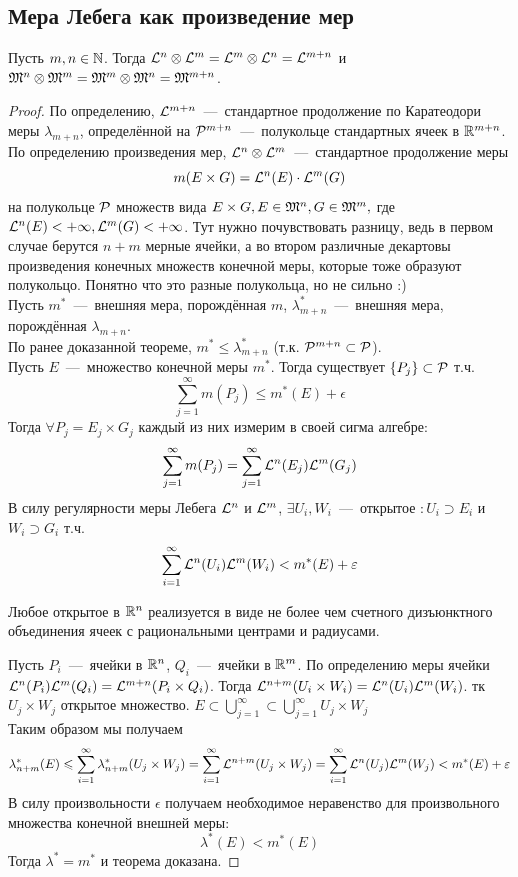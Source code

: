 \subsection{Мера Лебега как произведение мер}
\begin{theorem}
    Пусть $m, n \in \mathbb{N}$. Тогда $\mathcal{L}^n \otimes \mathcal{L}^m = \mathcal{L}^m \otimes \mathcal{L}^n = \mathcal{L}^{m + n}$ и $\mathfrak{M}^n \otimes \mathfrak{M}^m = \mathfrak{M}^m \otimes \mathfrak{M}^n = \mathfrak{M}^{m + n}$.
\end{theorem}
\begin{proof}
    По определению, $\mathcal{L}^{m + n}$~---~стандартное продолжение по Каратеодори меры $\lambda_{m + n}$, определённой на $\mathcal{P}^{m + n}$~---~полукольце стандартных ячеек в $\mathbb{R}^{m + n}$. \\
    По определению произведения мер, $\mathcal{L}^n \otimes \mathcal{L}^m$~---~стандартное продолжение меры $$m(E \times G) = \mathcal{L}^n(E)\cdot\mathcal{L}^m(G)$$ на полукольце $\mathcal{P}$ множеств вида $E \times G, E \in \mathfrak{M}^n, G \in \mathfrak{M}^m,$ где $ \mathcal{L}^n(E) < +\infty, \mathcal{L}^m(G) < +\infty$. Тут нужно почувствовать разницу, ведь в первом случае берутся  $n+m$ мерные ячейки, а во втором различные декартовы произведения конечных множеств конечной меры, которые тоже образуют полукольцо. Понятно что это разные полукольца, но не сильно :) \\
    Пусть $m^*$~---~внешняя мера, порождённая $m$, $\lambda_{m + n}^*$~---~внешняя мера, порождённая $\lambda_{m + n}$. \\
    По ранее доказанной теореме, $m^* \leq \lambda_{m + n}^*$ (т.к. $\mathcal{P}^{m + n} \subset \mathcal{P}$). \\
    Пусть $E$~---~множество конечной меры $m^*$. Тогда существует $\{P_j\} \subset \mathcal{P}$ т.ч. \[\sum\limits_{j = 1}^\infty m(P_j) \leq m^*(E) + \epsilon\]
    Тогда $\forall P_j = E_j \times G_j$ каждый из них измерим в своей сигма алгебре:
    \[
    \sum\limits_{j = 1}^\infty m(P_j) =  \sum\limits_{j = 1}^\infty \mathcal{L}^n(E_j) \mathcal{L}^m(G_j)
    \]
    В силу регулярности меры Лебега $\mathcal{L}^n$ и $\mathcal{L}^m$, $\exists U_i, W_i$~---~открытое $:U_i\supset E_i$ и $W_i \supset G_i$ т.ч. \[\sum\limits_{i = 1}^\infty \mathcal{L}^n(U_i)\mathcal{L}^m(W_i) < m^*(E) + \varepsilon\]
\begin{fact}
    Любое открытое в $\mathbb{R}^n$ реализуется в виде не более чем счетного дизъюнктного объединения ячеек с рациональными центрами и радиусами.
\end{fact}
    Пусть $P_i$~---~ячейки в $\mathbb{R}^n$, $Q_i$~---~ячейки в $\mathbb{R}^m$. По определению меры ячейки $\mathcal{L}^n(P_i)\mathcal{L}^m(Q_i) = \mathcal{L}^{m + n}(P_i \times Q_i)$. Тогда $\mathcal{L}^{n + m}(U_i \times W_i) = \mathcal{L}^n(U_i)\mathcal{L}^m(W_i)$. тк $U_j \times W_j$ открытое множество. $E \subset \bigcup_{j=1}^{\infty} \subset \bigcup_{j=1}^{\infty} U_j \times W_j$   \\
    Таким образом мы получаем \[\lambda^*_{n+m}(E) \leqslant \sum\limits_{i = 1}^\infty \lambda^*_{n+m} (U_j \times W_j) = \sum\limits_{i = 1}^\infty \mathcal{L}^{n+m} (U_j \times W_j) = \sum\limits_{i = 1}^\infty \mathcal{L}^{n} (U_j) \mathcal{L}^{m}(W_j) <  m^*(E) +\varepsilon\]
    В силу произвольности $\epsilon$  получаем необходимое неравенство для произвольного множества конечной внешней меры: \[\lambda^*(E) < m^*(E)\]
    Тогда $\lambda^* = m^*$ и теорема доказана.
\end{proof}

